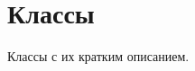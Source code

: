 \section{Классы}
Классы с их кратким описанием.\begin{DoxyCompactList}
\item{}
\item{}
\end{DoxyCompactList}
